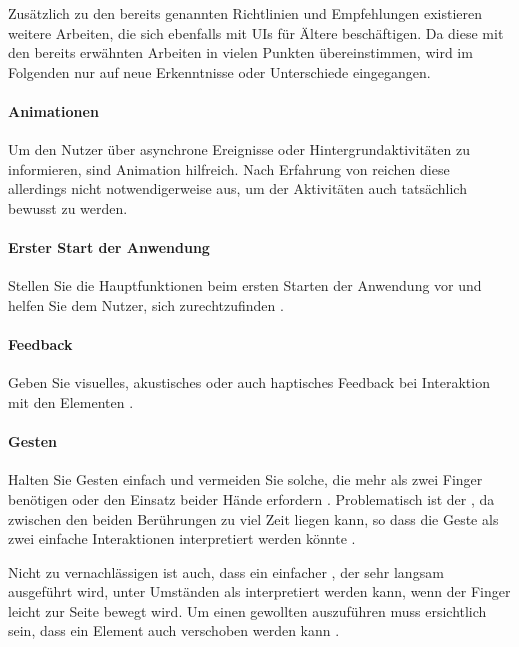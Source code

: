 Zusätzlich zu den bereits genannten Richtlinien und Empfehlungen existieren weitere Arbeiten, die sich ebenfalls mit \aclp{UI} für Ältere beschäftigen. Da diese mit den bereits erwähnten Arbeiten in vielen Punkten übereinstimmen, wird im Folgenden nur auf neue Erkenntnisse oder Unterschiede eingegangen.

\paragraph{Animationen}
Um den Nutzer über asynchrone Ereignisse oder Hintergrundaktivitäten zu informieren, sind Animation hilfreich. Nach Erfahrung von \textcite{Leonardi:2010:An-Exploratory-Study-of-a-Touch-Based} reichen diese allerdings nicht notwendigerweise aus, um der Aktivitäten auch tatsächlich bewusst zu werden.

\paragraph{Erster Start der Anwendung}
Stellen Sie die Hauptfunktionen beim ersten Starten der Anwendung vor und helfen Sie dem Nutzer, sich zurechtzufinden \cite{Almeida:2015:Recommendations-for-the-Development-of-Web-Interfaces}.

\paragraph{Feedback}
Geben Sie visuelles, akustisches oder auch haptisches Feedback bei Interaktion mit den Elementen \cite{Almeida:2015:Recommendations-for-the-Development-of-Web-Interfaces}.

\paragraph{Gesten}
Halten Sie Gesten einfach und vermeiden Sie solche, die mehr als zwei Finger benötigen oder den Einsatz beider Hände erfordern \cite{Almeida:2015:Recommendations-for-the-Development-of-Web-Interfaces}. Problematisch ist der , da zwischen den beiden Berührungen zu viel Zeit liegen kann, so dass die Geste als zwei einfache Interaktionen interpretiert werden könnte \cite{Boll:2015:User-Interfaces-with}.

Nicht zu vernachlässigen ist auch, dass ein einfacher , der sehr langsam ausgeführt wird, unter Umständen als  interpretiert werden kann, wenn der Finger leicht zur Seite bewegt wird. Um einen gewollten  auszuführen muss ersichtlich sein, dass ein Element auch verschoben werden kann \cite{Leonardi:2010:An-Exploratory-Study-of-a-Touch-Based}.

